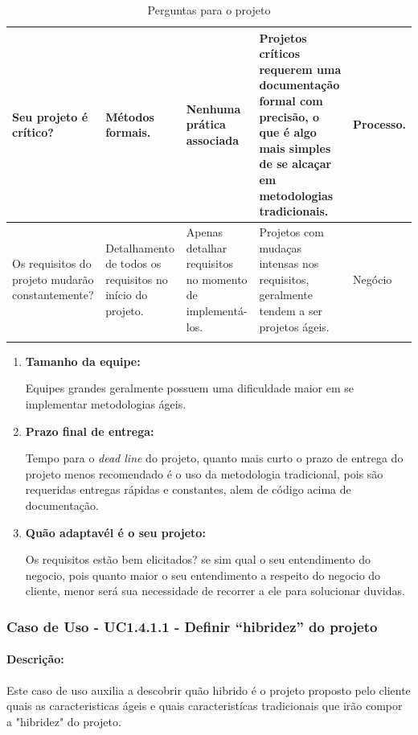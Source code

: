 \begin{longtable}{|p{3.5cm}|p{3.5cm}|p{3.5cm}|p{3.5cm}|p{2cm}|}
						Seu projeto é crítico? &
						Métodos formais. &
						Nenhuma prática associada &
						Projetos críticos requerem uma documentação formal com precisão, o que é algo mais simples de se alcaçar em metodologias tradicionais. &
						Processo.
						\\ \hline

						Os requisitos do projeto mudarão constantemente? &
						Detalhamento de todos os requisitos no início do projeto. &
						Apenas detalhar requisitos no momento de implementá-los. &
						Projetos com mudaças intensas nos requisitos, geralmente tendem a ser projetos ágeis. &
						Negócio
						\\ \hline
					\caption{Perguntas para o projeto}
					\label{tab:perguntas_projeto}
					\end{longtable}

					\begin{enumerate}
						\item \textbf{Tamanho da equipe:}

							Equipes grandes geralmente possuem uma dificuldade maior em se implementar metodologias ágeis.
					
		
											
						\item \textbf{Prazo final de entrega:}

							Tempo para o \textit{dead line} do projeto, quanto mais curto o prazo de entrega do projeto menos recomendado é o uso da metodologia tradicional, pois são requeridas entregas rápidas e constantes, alem de código acima de documentação.

						\item \textbf{Quão adaptavél é o seu projeto:}
							
							Os requisitos estão bem elicitados? se sim qual o seu entendimento do negocio, pois quanto maior o seu entendimento a respeito do negocio do cliente, menor será sua necessidade de recorrer a ele para solucionar duvidas.
					\end{enumerate}
	
\subsubsection{Caso de Uso - UC1.4.1.1 - Definir ``hibridez'' do projeto}
\paragraph{Descrição:}
Este caso de uso auxilia a descobrir quão hibrido é o projeto proposto pelo cliente quais as caracteristicas ágeis e quais caracteristícas tradicionais que irão compor a "hibridez" do projeto.


